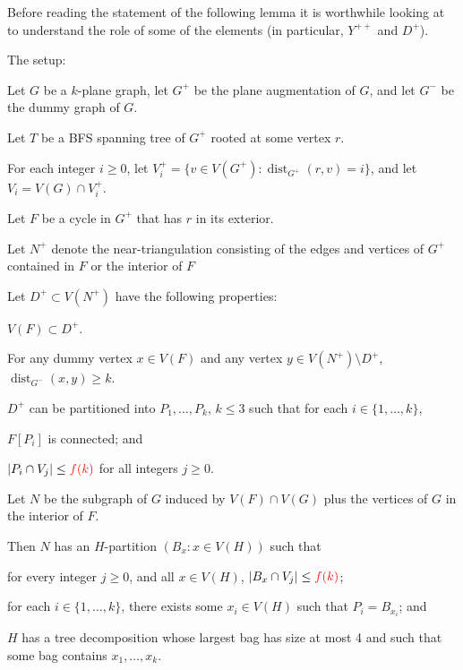 \documentclass{patmorin}
\DeclareMathOperator{\dist}{dist}
\newcommand{\fk}{{\color{red}f(k)}}
\begin{document}
Before reading the statement of the following lemma it is worthwhile looking at  to understand the role of some of the elements (in particular, $Y^{++}$ and $D^+$).

\begin{lem} The setup:
  \begin{compactenum}
    \item Let $G$ be a $k$-plane graph, let $G^+$ be the plane augmentation of $G$, and let $G^-$ be the dummy graph of $G$.
    \item Let $T$ be a BFS spanning tree of $G^+$ rooted at some vertex $r$.
    \item For each integer $i\ge 0$, let $V^+_i=\{v\in V(G^+):\dist_{G^+}(r,v)=i\}$, and let $V_i=V(G)\cap V^+_i$.
    \item Let $F$ be a cycle in $G^+$ that has $r$ in its exterior.
    \item Let $N^+$ denote the near-triangulation consisting of the edges and vertices of $G^+$ contained in $F$ or the interior of $F$
    \item Let $D^+\subset V(N^+)$ have the following properties:
    \begin{compactenum}
      \item $V(F)\subset D^+$.
      \item For any dummy vertex $x\in V(F)$ and any vertex $y\in V(N^+)\setminus D^+$,  $\dist_{G^-}(x,y) \ge k$.
      \item $D^+$ can be partitioned into $P_1,\ldots,P_k$, $k\le 3$ such that for each $i\in\{1,\ldots,k\}$,
      \begin{compactenum}
        \item $F[P_i]$ is connected; and
        \item $|P_i\cap V_j| \le \fk$ for all integers $j\ge 0$.
      \end{compactenum}
    \end{compactenum}
    \item Let $N$ be the subgraph of $G$ induced by $V(F)\cap V(G)$ plus the vertices of $G$ in the interior of $F$.
  \end{compactenum}
  Then $N$ has an $H$-partition $(B_x : x\in V(H))$ such that
  \begin{compactenum}
    \item for every integer $j\ge 0$, and all $x\in V(H)$, $|B_x\cap V_j|\le \fk$; 
    \item for each $i\in\{1,\ldots,k\}$, there exists some $x_i\in V(H)$ such that $P_i=B_{x_i}$; and
    \item $H$ has a tree decomposition whose largest bag has size at most 4 and such that some bag contains $x_1,\ldots,x_k$.
  \end{compactenum}
\end{lem}
\end{document}
